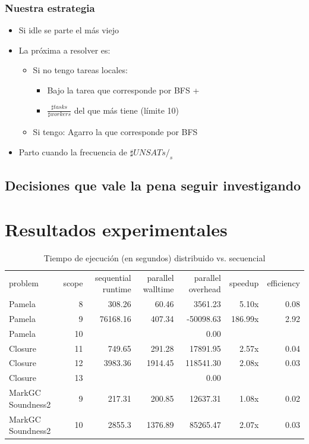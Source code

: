 \subsubsection{Nuestra estrategia}

\begin{itemize}
	\item Si idle se parte el más viejo
	\item La próxima a resolver es:
		\begin{itemize}
			\item Si no tengo tareas locales:
				\begin{itemize}
					\item Bajo la tarea que corresponde por BFS +
					\item $\frac{\sharp tasks}{\sharp workers}$ del que más tiene (límite 10)
				\end{itemize}
			\item Si tengo: Agarro la que corresponde por BFS
		\end{itemize}
	\item Parto cuando la frecuencia de $\sharp UNSATs/_s$
\end{itemize}

\subsection{Decisiones que vale la pena seguir investigando}

\section{Resultados experimentales}

\begin{table}[h]\tiny
	\begin{tabular}{lrrrrrr}
		\toprule
		problem	&	scope	&	sequential runtime	&	parallel walltime	&	parallel overhead	&	speedup	&	efficiency \\
		\cmidrule(r){1-7}
		Pamela	&	8	&	308.26	&	60.46	&	3561.23	&	5.10x	&	0.08 \\
		Pamela	&	9	&	76168.16	&	407.34	&	-50098.63	&	186.99x	&	2.92 \\
		Pamela	&	10	&		&		&	0.00	&		&	 \\
		\cmidrule(r){1-7}
		Closure	&	11	&	749.65	&	291.28	&	17891.95	&	2.57x	&	0.04 \\
		Closure	&	12	&	3983.36	&	1914.45	&	118541.30	&	2.08x	&	0.03 \\
		Closure	&	13	&		&		&	0.00	&		&	 \\
		\cmidrule(r){1-7}
		MarkGC Soundness2	&	9	&	217.31	&	200.85	&	12637.31	&	1.08x	&	0.02 \\
		MarkGC Soundness2	&	10	&	2855.3	&	1376.89	&	85265.47	&	2.07x	&	0.03 \\
		\bottomrule
	\end{tabular}
	\caption{Tiempo de ejecución (en segundos) distribuido vs. secuencial}
\end{table}